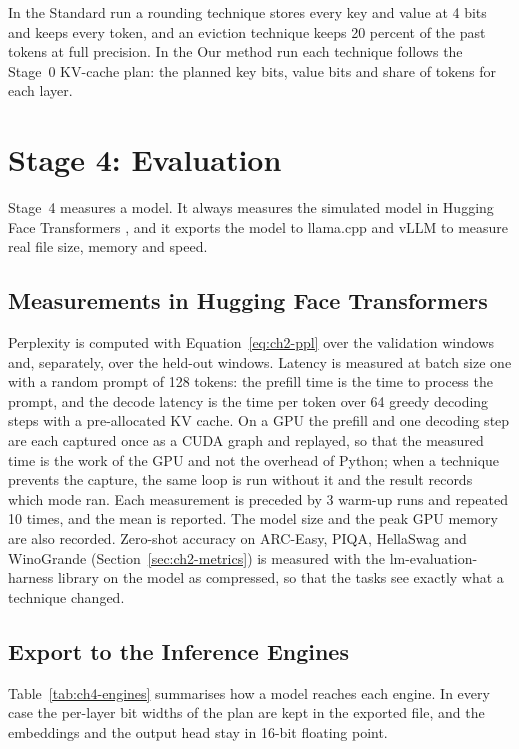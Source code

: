 \documentclass[
11pt, %
english, %
singlespacing, %
headsepline, %
]{MastersDoctoralThesis} %
\begin{document}
In the Standard run a rounding technique stores every key and value at 4 bits and keeps every token, and an eviction technique keeps 20 percent of the past tokens at full precision. In the Our method run each technique follows the Stage~0 KV-cache plan: the planned key bits, value bits and share of tokens for each layer.

\section{Stage 4: Evaluation}
\label{sec:ch4-stage4}

Stage~4 measures a model. It always measures the simulated model in Hugging Face Transformers \cite{wolf2020transformers}, and it exports the model to llama.cpp \cite{ggml2025llamacpp} and vLLM \cite{kwon2023vllm} to measure real file size, memory and speed.

\subsection{Measurements in Hugging Face Transformers}
\label{sec:ch4-hf}

Perplexity is computed with Equation~\ref{eq:ch2-ppl} over the validation windows and, separately, over the held-out windows. Latency is measured at batch size one with a random prompt of 128 tokens: the prefill time is the time to process the prompt, and the decode latency is the time per token over 64 greedy decoding steps with a pre-allocated KV cache. On a GPU the prefill and one decoding step are each captured once as a CUDA graph and replayed, so that the measured time is the work of the GPU and not the overhead of Python; when a technique prevents the capture, the same loop is run without it and the result records which mode ran. Each measurement is preceded by 3 warm-up runs and repeated 10 times, and the mean is reported. The model size and the peak GPU memory are also recorded. Zero-shot accuracy on ARC-Easy, PIQA, HellaSwag and WinoGrande (Section~\ref{sec:ch2-metrics}) is measured with the lm-evaluation-harness library on the model as compressed, so that the tasks see exactly what a technique changed.

\subsection{Export to the Inference Engines}
\label{sec:ch4-export}

Table~\ref{tab:ch4-engines} summarises how a model reaches each engine. In every case the per-layer bit widths of the plan are kept in the exported file, and the embeddings and the output head stay in 16-bit floating point.
\end{document}
